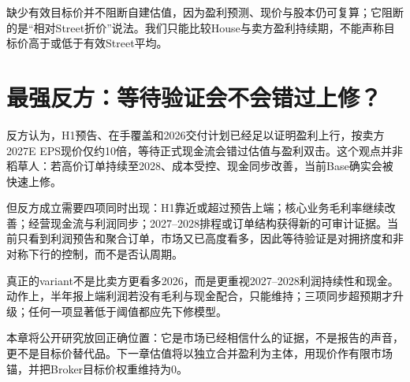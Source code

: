 缺少有效目标价并不阻断自建估值，因为盈利预测、现价与股本仍可复算；它阻断的是“相对Street折价”说法。我们只能比较House与卖方盈利持续期，不能声称目标价高于或低于有效Street平均。

\section{最强反方：等待验证会不会错过上修？}

反方认为，H1预告、在手覆盖和2026交付计划已经足以证明盈利上行，按卖方2027E EPS现价仅约10倍，等待正式现金流会错过估值与盈利双击。这个观点并非稻草人：若高价订单持续至2028、成本受控、现金同步改善，当前Base确实会被快速上修。

但反方成立需要四项同时出现：H1靠近或超过预告上端；核心业务毛利率继续改善；经营现金流与利润同步；2027--2028排程或订单结构获得新的可审计证据。当前只看到利润预告和聚合订单，市场又已高度看多，因此等待验证是对拥挤度和非对称下行的控制，而不是否认周期。

\begin{keyinsight}
真正的variant不是比卖方更看多2026，而是更重视2027--2028利润持续性和现金。动作上，半年报上端利润若没有毛利与现金配合，只能维持；三项同步超预期才升级；任何一项显著低于阈值都应先下修模型。
\end{keyinsight}

本章将公开研究放回正确位置：它是市场已经相信什么的证据，不是报告的声音，更不是目标价替代品。下一章估值将以独立合并盈利为主体，用现价作有限市场锚，并把Broker目标价权重维持为0。
